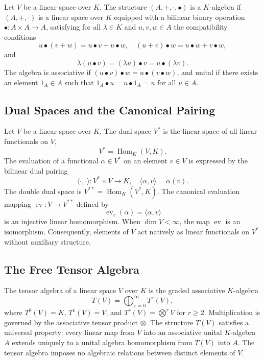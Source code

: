 \documentclass[11pt,a4paper]{article}
\newcommand{\ev}{\operatorname{ev}}
\newcommand{\Hom}{\operatorname{Hom}}
\begin{document}
Let $V$ be a linear space over $K$.
The structure $(A, +, \cdot, \bullet)$ is a $K$-algebra if $(A, +, \cdot)$ is a
linear space over $K$ equipped with a bilinear binary operation $\bullet : A
\times A \to A$, satisfying for all $\lambda \in K$ and $u, v, w \in A$ the
compatibility conditions
\begin{equation}
  u \bullet (v + w) = u \bullet v + u \bullet w, \quad
  (u + v) \bullet w = u \bullet w + v \bullet w,
\end{equation}
and
\begin{equation}
  \lambda (u \bullet v) = (\lambda u) \bullet v = u \bullet (\lambda v).
\end{equation}
The algebra is associative if $(u \bullet v) \bullet w = u \bullet (v \bullet
w)$, and unital if there exists an element $1_A \in A$ such that $1_A \bullet u
= u \bullet 1_A = u$ for all $u \in A$.

\subsection{Dual Spaces and the Canonical Pairing}
\label{subsec:dual_spaces}

Let $V$ be a linear space over $K$.
The dual space $V^*$ is the linear space of all linear functionals on $V$,
\begin{equation}
  V^* = \Hom_K(V, K).
\end{equation}
The evaluation of a functional $\alpha \in V^*$ on an element $v \in V$ is
expressed by the bilinear dual pairing
\begin{equation}
  \langle \cdot, \cdot \rangle : V^* \times V \to K, \quad
  \langle \alpha, v \rangle = \alpha(v).
\end{equation}
The double dual space is $V^{**} = \Hom_K(V^*, K)$.
The canonical evaluation mapping $\ev : V \to V^{**}$ defined by
\begin{equation}
  \ev_v(\alpha) = \langle \alpha, v \rangle
\end{equation}
is an injective linear homomorphism.
When $\dim V < \infty$, the map $\ev$ is an isomorphism.
Consequently, elements of $V$ act natively as linear functionals on $V^*$
without auxiliary structure.

\subsection{The Free Tensor Algebra}
\label{subsec:tensor_algebra}

The tensor algebra of a linear space $V$ over $K$ is the graded associative
$K$-algebra
\begin{equation}
  T(V) = \bigoplus_{r=0}^\infty T^r(V),
\end{equation}
where $T^0(V) = K$, $T^1(V) = V$, and $T^r(V) = \bigotimes^r V$ for $r \ge 2$.
Multiplication is governed by the associative tensor product $\otimes$.
The structure $T(V)$ satisfies a universal property: every linear map from $V$
into an associative unital $K$-algebra $A$ extends uniquely to a unital algebra
homomorphism from $T(V)$ into $A$.
The tensor algebra imposes no algebraic relations between distinct elements
of $V$.
\end{document}
